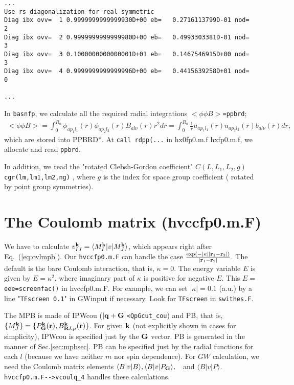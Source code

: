 \documentclass[a4paper,10pt,epsf,fleqn]{article}
\newcommand{\bfq}{{\bf q}}
\newcommand{\bfk}{{\bf k}}
\newcommand{\bfr}{{\bf r}}
\newcommand{\bfG}{{\bf G}}
\newcommand{\bfR}{{\bf R}}
\newcommand{\io}[1]{{\sf  #1}}
\newcommand{\req}[1]{\mbox{Eq.~(\ref{#1})}}
\begin{document}
{\baselineskip=4mm
\begin{verbatim}
...
Use rs diagonalization for real symmetric 
Diag ibx ovv=  1 0.9999999999999930D+00 eb=   0.2716113799D-01 nod=   2
Diag ibx ovv=  2 0.9999999999999980D+00 eb=   0.4993303381D-01 nod=   3
Diag ibx ovv=  3 0.1000000000000001D+01 eb=   0.1467546915D+00 nod=   3
Diag ibx ovv=  4 0.9999999999999996D+00 eb=   0.4415639258D+01 nod=   0

...
\end{verbatim}
}

In \verb|basnfp|, we calculate all the required 
radial integrations $<\phi \phi B>$\verb!=ppbrd!;
\begin{eqnarray}
   <\phi \phi B> = \int_0^{R_a}
   \phi_{ap_1 l_1}(r) \phi_{ap_2 l_2}(r) B_{al\nu}(r) r^2 dr
   = \int_0^{R_a} \frac{1}{r}
     u_{ap_1l_1}(r) u_{ap_2l_2}(r) b_{al\nu}(r) dr,
\end{eqnarray}
which are stored into \io{PPBRD*}.  
At \verb!call rdpp(...! in {\sf hx0fp0.m.f hxfp0.m.f},
we allocate and read \verb!ppbrd!. 

In addition, we read the "rotated Clebsh-Gordon coefficient"
$C(L,L_1,L_2,g)$ \verb!cgr(lm,lm1,lm2,ng)! 
, where $g$ is the index for space group
coefficient ( rotated by point group symmetries).




\section{The Coulomb matrix (hvccfp0.m.F)}
We have to calculate
$v_{IJ}^\bfk= \langle M^{\bf k}_{I} |v|  M^{\bf k}_J \rangle$, which
appears right after \req{eq:ovlmpb}.
Our \verb#hvccfp0.m.F# can handle the
case $\frac{\exp(- |\kappa| |\bfr_1-\bfr_2|)}{|\bfr_1-\bfr_2|}$.
The default is the bare Coulomb interaction, that is, $\kappa=0$. 
The energy variable $E$ is given by $E=\kappa^2$, where
imaginary part of $\kappa$ is positive for negative $E$.
This $E=$\verb#eee=screenfac()# in hvccfp0.m.F. 
For example, we can set $|\kappa|=0.1$ (a.u.) by a line
"{\tt TFscreen 0.1}" in \io{GWinput} if necessary. Look for {\tt TFscreen} in \verb#swithes.F#.

The MPB is made of IPWcou ($|\bfq+\bfG|$\verb#<QpGcut_cou#) and PB,
that is, $\{M^{\bf k}_J\}=\{P_\bfG^\bfk(\bfr), B^\bfk_{\bfR{L}\mu}(\bfr)\}$.
For given $\bfk$ (not explicitly shown in cases for simplicity), 
IPWcou is specified just by the $\bfG$ vector.
PB is generated in the manner of Sec.\ref{sec:mpbsec}. 
PB can be specified just by the radial functions for each $l$ 
(because we have neither $m$ nor spin dependence).
For $GW$ calculation, we need the Coulomb matrix elements
$\langle B|v|B \rangle,\langle B|v|P_\bfG \rangle,$　and $\langle B|v|P \rangle$. \verb#hvccfp0.m.F-->vcoulq_4# handles these calculations.
\end{document}
